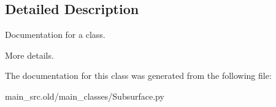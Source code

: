 \subsection{Detailed Description}
Documentation for a class. 

More details. 

The documentation for this class was generated from the following file\-:\begin{DoxyCompactItemize}
\item 
main\-\_\-src.\-old/main\-\_\-classes/Subsurface.\-py\end{DoxyCompactItemize}

